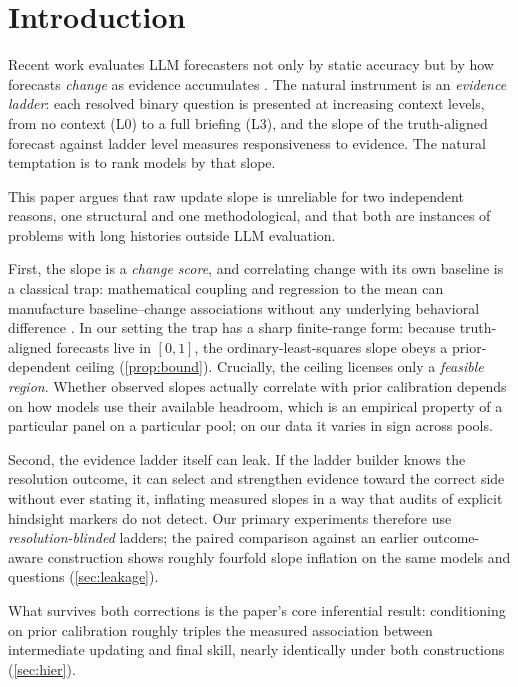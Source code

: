 \documentclass[conference]{IEEEtran}
\theoremstyle{plain}
\theoremstyle{remark}
\begin{document}
\section{Introduction}

Recent work evaluates LLM forecasters not only by static accuracy \citep{halawi2024approaching,karger2024forecastbench,schoenegger2024wisdom,alur2025aia} but by how forecasts \emph{change} as evidence accumulates \citep{yuan2025assessing}. The natural instrument is an \emph{evidence ladder}: each resolved binary question is presented at increasing context levels, from no context (L0) to a full briefing (L3), and the slope of the truth-aligned forecast against ladder level measures responsiveness to evidence. The natural temptation is to rank models by that slope.

This paper argues that raw update slope is unreliable for two independent reasons, one structural and one methodological, and that both are instances of problems with long histories outside LLM evaluation.

First, the slope is a \emph{change score}, and correlating change with its own baseline is a classical trap: mathematical coupling and regression to the mean can manufacture baseline--change associations without any underlying behavioral difference \citep{oldham1962note,blomqvist1977relation,tu2007revisiting}. In our setting the trap has a sharp finite-range form: because truth-aligned forecasts live in $[0,1]$, the ordinary-least-squares slope obeys a prior-dependent ceiling (\cref{prop:bound}). Crucially, the ceiling licenses only a \emph{feasible region}. Whether observed slopes actually correlate with prior calibration depends on how models use their available headroom, which is an empirical property of a particular panel on a particular pool; on our data it varies in sign across pools.

Second, the evidence ladder itself can leak. If the ladder builder knows the resolution outcome, it can select and strengthen evidence toward the correct side without ever stating it, inflating measured slopes in a way that audits of explicit hindsight markers do not detect. Our primary experiments therefore use \emph{resolution-blinded} ladders; the paired comparison against an earlier outcome-aware construction shows roughly fourfold slope inflation on the same models and questions (\cref{sec:leakage}).

What survives both corrections is the paper's core inferential result: conditioning on prior calibration roughly triples the measured association between intermediate updating and final skill, nearly identically under both constructions (\cref{sec:hier}).
\end{document}
